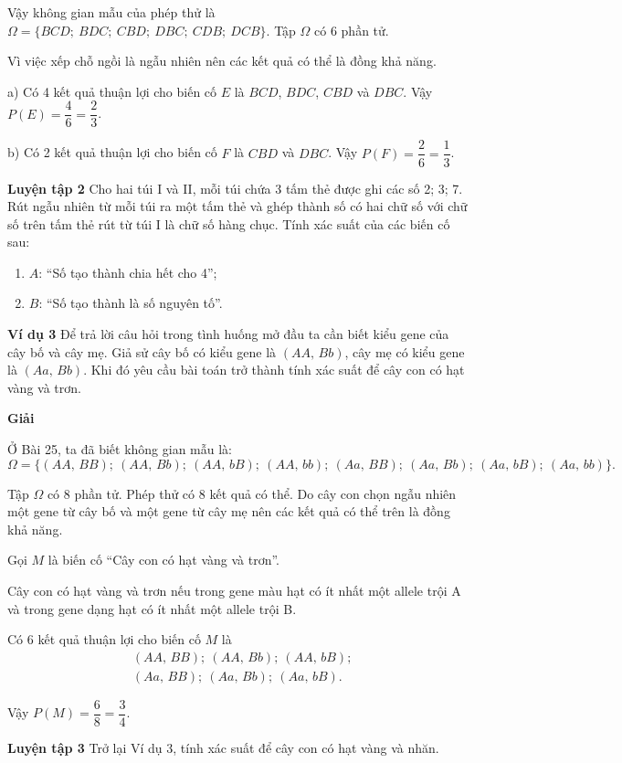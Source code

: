 \begin{lesson}
    Vậy không gian mẫu của phép thử là $\Omega=\{BCD;\ BDC;\ CBD;\ DBC;\ CDB;\ DCB\}$. Tập $\Omega$ có 6 phần tử.

    Vì việc xếp chỗ ngồi là ngẫu nhiên nên các kết quả có thể là đồng khả năng.

    a) Có 4 kết quả thuận lợi cho biến cố $E$ là $BCD$, $BDC$, $CBD$ và $DBC$. Vậy $P(E)=\dfrac{4}{6}=\dfrac{2}{3}$.

    b) Có 2 kết quả thuận lợi cho biến cố $F$ là $CBD$ và $DBC$. Vậy $P(F)=\dfrac{2}{6}=\dfrac{1}{3}$.

    \textbf{Luyện tập 2} Cho hai túi I và II, mỗi túi chứa 3 tấm thẻ được ghi các số 2; 3; 7. Rút ngẫu nhiên từ mỗi túi ra một tấm thẻ và ghép thành số có hai chữ số với chữ số trên tấm thẻ rút từ túi I là chữ số hàng chục. Tính xác suất của các biến cố sau:
    \begin{enumerate}[label=\alph*)]
        \item $A$: “Số tạo thành chia hết cho 4”;
        \item $B$: “Số tạo thành là số nguyên tố”.
    \end{enumerate}

    \answerline
    \answerline

    \textbf{Ví dụ 3} Để trả lời câu hỏi trong tình huống mở đầu ta cần biết kiểu gene của cây bố và cây mẹ. Giả sử cây bố có kiểu gene là $(AA,\,Bb)$, cây mẹ có kiểu gene là $(Aa,\,Bb)$. Khi đó yêu cầu bài toán trở thành tính xác suất để cây con có hạt vàng và trơn.

    \textbf{Giải}

    Ở Bài 25, ta đã biết không gian mẫu là:
    \[
        \Omega=\{(AA,\,BB);\ (AA,\,Bb);\ (AA,\,bB);\ (AA,\,bb);\ (Aa,\,BB);\ (Aa,\,Bb);\ (Aa,\,bB);\ (Aa,\,bb)\}.
    \]

    Tập $\Omega$ có 8 phần tử. Phép thử có 8 kết quả có thể. Do cây con chọn ngẫu nhiên một gene từ cây bố và một gene từ cây mẹ nên các kết quả có thể trên là đồng khả năng.

    Gọi $M$ là biến cố “Cây con có hạt vàng và trơn”.

    Cây con có hạt vàng và trơn nếu trong gene màu hạt có ít nhất một allele trội A và trong gene dạng hạt có ít nhất một allele trội B.

    Có 6 kết quả thuận lợi cho biến cố $M$ là
    \[
        \begin{aligned}
            &(AA,\,BB);\ (AA,\,Bb);\ (AA,\,bB);\\
            &(Aa,\,BB);\ (Aa,\,Bb);\ (Aa,\,bB).
        \end{aligned}
    \]

    Vậy $P(M)=\dfrac{6}{8}=\dfrac{3}{4}$.

    \textbf{Luyện tập 3} Trở lại Ví dụ 3, tính xác suất để cây con có hạt vàng và nhăn.

    \answerline
    \answerline
\end{lesson}

